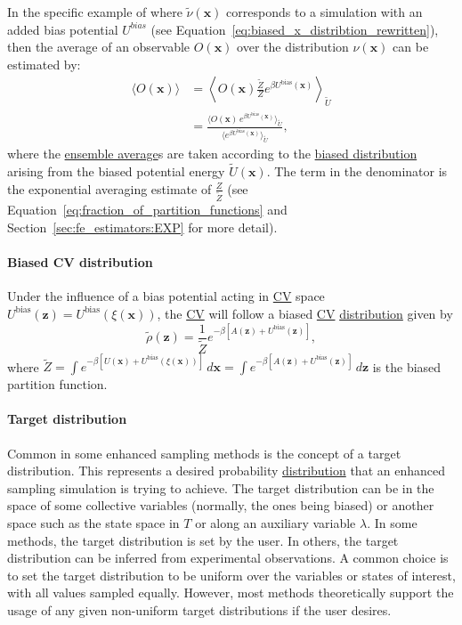 \documentclass[9pt,review]{livecoms}
\newcommand{\vx}{\mathbf{x}}
\newcommand{\vz}{\mathbf{z}}
\begin{document}
In the specific example of where $\tilde \nu(\vx)$ corresponds to a simulation with an added bias potential $U^{bias}$ (see Equation~\ref{eq:biased_x_distribtion_rewritten}), then the average of an observable $O(\vx)$ over the distribution $\nu(\vx)$ can be estimated by:
\begin{align}
\label{eq:reweighting_bias_potential}
\langle O(\vx) \rangle &= \left \langle O(\vx) \frac{\tilde{Z}}{Z}e^{\beta U^\mathrm{bias}(\vx)} \right \rangle_{\tilde U} \nonumber  \\
 &= \frac{\langle O(\vx) \, e^{\beta U^\mathrm{bias}(\vx)} \rangle_{\tilde U}}
{\langle e^{\beta U^\mathrm{bias}(\vx)} \rangle_{\tilde U}},
\end{align}
where the \hyperlink{ref:ensemble_average} {ensemble average}s are taken according to the \hyperlink{ref:BiasedDist} {biased distribution} arising from the biased potential energy $\tilde U(\vx)$. The term in the denominator is the exponential averaging estimate of $\frac{Z}{\tilde Z}$ (see Equation~\ref{eq:fraction_of_partition_functions} and Section~\ref{sec:fe_estimators:EXP} for more detail).

\hypertarget{ref:BiasedCVDist} {\paragraph{Biased CV distribution}}
Under the influence of a bias potential acting in \hyperlink{ref:CV} {CV} space $U^\mathrm{bias}(\vz)=U^\mathrm{bias}(\xi(\vx))$, the \hyperlink{ref:CV} {CV} will follow a biased \hyperlink{ref:CV} {CV} \hyperlink{ref:Distribution} {distribution} given by
\begin{equation}
\label{eq:BiasedCVDistrib}
\tilde \rho(\vz) = \frac{1}{\tilde{Z}}
e^{-\beta \left[
A(\vz) + U^\mathrm{bias}(\vz)
\right]},
\end{equation}
where $\tilde{Z} = \int e^{-\beta\left [ U(\vx) + U^\mathrm{bias}(\xi(\vx)) \right]} \, d\vx = \int e^{-\beta\left [ A(\vz) + U^\mathrm{bias}(\vz) \right]} \, d\vz$ is the biased partition function.

\hypertarget{ref:targetdist}{\paragraph{Target distribution}}
Common in some enhanced sampling methods is the concept of a target distribution. This represents a desired probability \hyperlink{ref:Distribution} {distribution} that an enhanced sampling simulation is trying to achieve. The target distribution can be in the space of some collective variables (normally, the ones being biased) or another space such as the state space in $T$ or along an auxiliary variable $\lambda$. In some methods, the target distribution is set by the user. In others, the target distribution can be inferred from experimental observations. A common choice is to set the target distribution to be uniform over the variables or states of interest, with all values sampled equally. However, most methods theoretically support the usage of any given non-uniform target distributions if the user desires.
\end{document}
